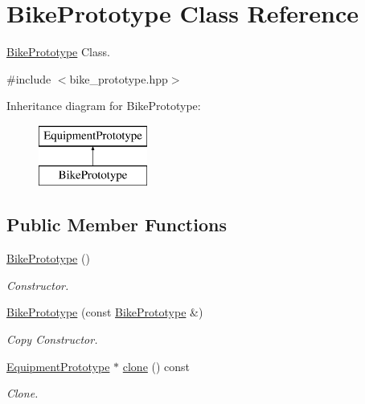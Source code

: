 \hypertarget{class_bike_prototype}{}\section{Bike\+Prototype Class Reference}
\label{class_bike_prototype}


\hyperlink{class_bike_prototype}{Bike\+Prototype} Class.  




{\ttfamily \#include $<$bike\+\_\+prototype.\+hpp$>$}

Inheritance diagram for Bike\+Prototype\+:\begin{figure}[H]
\begin{center}
\leavevmode
\includegraphics[height=2.000000cm]{class_bike_prototype}
\end{center}
\end{figure}
\subsection*{Public Member Functions}
\begin{DoxyCompactItemize}
\item 
\hypertarget{class_bike_prototype_ae49515bfb795c1a9000d7168fd764cc9}{}\hyperlink{class_bike_prototype_ae49515bfb795c1a9000d7168fd764cc9}{Bike\+Prototype} ()\label{class_bike_prototype_ae49515bfb795c1a9000d7168fd764cc9}

\begin{DoxyCompactList}\small\item\em Constructor. \end{DoxyCompactList}\item 
\hypertarget{class_bike_prototype_a044c34974541500ea818be723c65a64a}{}\hyperlink{class_bike_prototype_a044c34974541500ea818be723c65a64a}{Bike\+Prototype} (const \hyperlink{class_bike_prototype}{Bike\+Prototype} \&)\label{class_bike_prototype_a044c34974541500ea818be723c65a64a}

\begin{DoxyCompactList}\small\item\em Copy Constructor. \end{DoxyCompactList}\item 
\hyperlink{class_equipment_prototype}{Equipment\+Prototype} $\ast$ \hyperlink{class_bike_prototype_a10732d6849be44963b62994b724605b1}{clone} () const 
\begin{DoxyCompactList}\small\item\em Clone. \end{DoxyCompactList}\end{DoxyCompactItemize}
